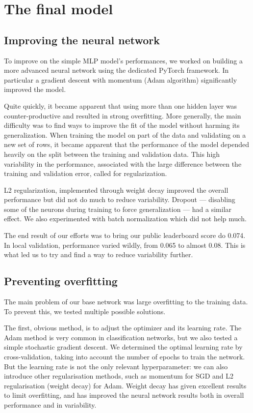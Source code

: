 \documentclass[a4paper,11pt,openany,extrafontsizes,oneside,article]{memoir}
\begin{document}
\chapter{The final model}

\section{Improving the neural network}

To improve on the simple MLP model's performances, we worked on
building a more advanced neural network using the dedicated PyTorch
framework. In particular a gradient descent with momentum (Adam
algorithm) significantly improved the model.

Quite quickly, it became apparent that using more than one hidden
layer was counter-productive and resulted in strong overfitting. More
generally, the main difficulty was to find ways to improve the fit of
the model without harming its generalization. When training the model
on part of the data and validating on a new set of rows, it became
apparent that the performance of the model depended heavily on the
split between the training and validation data. This high variability
in the performance, associated with the large difference between the
training and validation error, called for regularization.

L2 regularization, implemented through weight decay improved the
overall performance but did not do much to reduce variability. Dropout
--- disabling some of the neurons during training to force
generalization --- had a similar effect. We also experimented with
batch normalization which did not help much.

The end result of our efforts was to bring our public leaderboard
score do 0.074. In local validation, performance varied wildly, from
0.065 to almost 0.08. This is what led us to try and find a way to
reduce variability further.

\section{Preventing overfitting}

The main problem of our base network was large overfitting to the
training data. To prevent this, we tested multiple possible solutions.

The first, obvious method, is to adjust the optimizer and its learning
rate. The Adam method is very common in classification networks, but
we also tested a simple stochastic gradient descent. We determined the
optimal learning rate by cross-validation, taking into account the
number of epochs to train the network. But the learning rate is not
the only relevant hyperparameter: we can also introduce other
regularisation methods, such as momentum for SGD and L2 regularisation
(weight decay) for Adam. Weight decay has given excellent results to
limit overfitting, and has improved the neural network results both in
overall performance and in variability.
\end{document}
